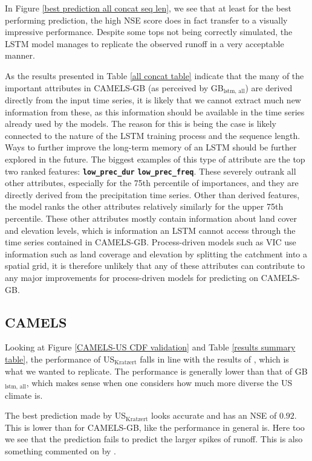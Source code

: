 In Figure \ref{best prediction all concat seq len}, we see that at least for the 
best performing prediction, the high NSE score does 
in fact transfer to a visually impressive performance. Despite some tops not being 
correctly simulated, the LSTM model manages to replicate the observed runoff in a 
very acceptable manner.

As the results presented in Table \ref{all concat table}
indicate that the many of the important attributes in CAMELS-GB (as perceived by 
GB$_\text{lstm, all}$) are derived directly from the 
input time series, it is likely that we cannot extract much new information from 
these, as this information should be available in the time series already used by 
the models. The reason for this is being the case is likely connected to the 
nature of the LSTM training process and the sequence length. Ways 
to further improve the long-term memory of an LSTM should be further explored 
in the future. The biggest examples of this type of attribute are the top two ranked 
features: \textbf{\texttt{low\_prec\_dur}} \textbf{\texttt{low\_prec\_freq}}. 
These severely outrank all other attributes, especially for the 75th percentile 
of importances, and they are directly derived from the precipitation time series.
Other than derived features, the model ranks the other attributes relatively similarly 
for the upper 75th percentile. These other attributes mostly contain information 
about land cover and elevation levels, which is information an LSTM cannot access 
through the time series contained in CAMELS-GB. Process-driven models such as VIC 
use information such as land coverage and elevation by splitting the catchment 
into a spatial grid, it is therefore unlikely that any of these attributes can 
contribute to any major improvements for process-driven models for predicting 
on CAMELS-GB.

\subsection{CAMELS}
Looking at Figure \ref{CAMELS-US CDF validation} and Table \ref{results summary table}, 
the performance of US$_\text{Kratzert}$ falls in line with the results of \citet{lstm_third_paper}, 
which is what we wanted to replicate. The performance is generally lower than that 
of GB$_\text{lstm, all}$, which makes sense when one considers how much more diverse 
the US climate is. 

The best prediction made by US$_\text{Kratzert}$ looks accurate and has an NSE of $0.92$. 
This is lower than for CAMELS-GB, like the performance in general is. Here too we 
see that the prediction fails to predict the larger spikes of runoff. 
This is also something commented on by \citet{lstm_first_paper}.

